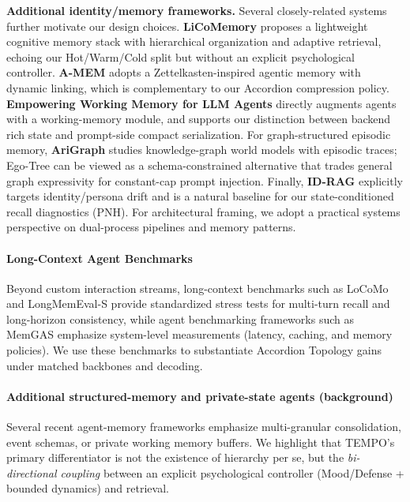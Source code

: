 \documentclass[11pt]{article}
\begin{document}
\textbf{Additional identity/memory frameworks.}
Several closely-related systems further motivate our design choices. \textbf{LiCoMemory} \cite{huang2025licomemory} proposes a lightweight cognitive memory stack with hierarchical organization and adaptive retrieval, echoing our Hot/Warm/Cold split but without an explicit psychological controller. \textbf{A-MEM} \cite{xu2025amem} adopts a Zettelkasten-inspired agentic memory with dynamic linking, which is complementary to our Accordion compression policy.
\textbf{Empowering Working Memory for LLM Agents} \cite{guo2023workingmemory} directly augments agents with a working-memory module, and supports our distinction between backend rich state and prompt-side compact serialization.
For graph-structured episodic memory, \textbf{AriGraph} \cite{anokhin2024arigraph} studies knowledge-graph world models with episodic traces; Ego-Tree can be viewed as a schema-constrained alternative that trades general graph expressivity for constant-cap prompt injection.
Finally, \textbf{ID-RAG} \cite{platnick2025idrag} explicitly targets identity/persona drift and is a natural baseline for our state-conditioned recall diagnostics (PNH).
For architectural framing, we adopt a practical systems perspective on dual-process pipelines and memory patterns.

\paragraph{Long-Context Agent Benchmarks}
Beyond custom interaction streams, long-context benchmarks such as LoCoMo and LongMemEval-S provide standardized stress tests for multi-turn recall and long-horizon consistency, while agent benchmarking frameworks such as MemGAS emphasize system-level measurements (latency, caching, and memory policies). We use these benchmarks to substantiate Accordion Topology gains under matched backbones and decoding.

\paragraph{Additional structured-memory and private-state agents (background)}
Several recent agent-memory frameworks emphasize multi-granular consolidation, event schemas, or private working memory buffers. We highlight that TEMPO's primary differentiator is not the existence of hierarchy per se, but the \emph{bi-directional coupling} between an explicit psychological controller (Mood/Defense + bounded dynamics) and retrieval.
\end{document}
